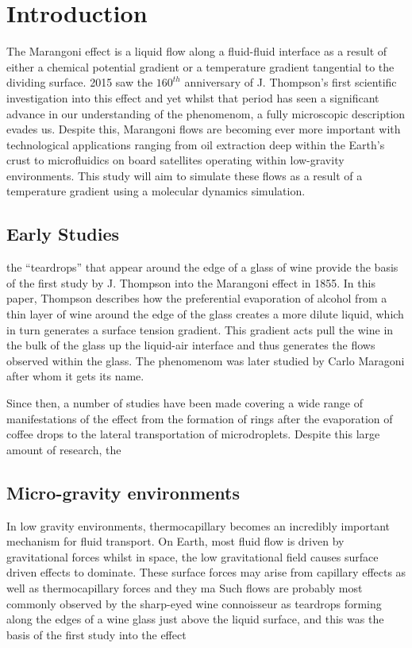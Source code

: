 \chapter{Introduction}

The Marangoni effect is a liquid flow along a fluid-fluid interface as a result of either a chemical potential gradient or a temperature gradient tangential to the dividing surface.
2015 saw the $160^{th}$ anniversary of J. Thompson's first scientific investigation into this effect and yet whilst that period has seen a significant advance in our understanding of the phenomenom, a fully microscopic description evades us.
Despite this, Marangoni flows are becoming ever more important with technological applications ranging from oil extraction deep within the Earth's crust to microfluidics on board satellites operating within low-gravity environments.
This study will aim to simulate these flows as a result of a temperature gradient using a molecular dynamics simulation.

\section{Early Studies} 
the ``teardrops'' that appear around the edge of a glass of wine provide the basis of the first study by J. Thompson into the Marangoni effect in 1855\cite{Thompson1855}.
In this paper, Thompson describes how the preferential evaporation of alcohol from a thin layer of wine around the edge of the glass creates a more dilute liquid, which in turn generates a surface tension gradient.
This gradient acts pull the wine in the bulk of the glass up the liquid-air interface and thus generates the flows observed within the glass.
The phenomenom was later studied by Carlo Maragoni after whom it gets its name.

Since then, a number of studies have been made covering a wide range of manifestations of the effect from the formation of rings after the evaporation of coffee drops to the lateral transportation of microdroplets.
Despite this large amount of research, the 

\section{Micro-gravity environments}
In low gravity environments, thermocapillary becomes an incredibly important mechanism for fluid transport.
On Earth, most fluid flow is driven by gravitational forces whilst in space, the low gravitational field causes surface driven effects to dominate.
These surface forces may arise from capillary effects as well as thermocapillary forces and they ma
Such flows are probably most commonly observed by the sharp-eyed wine connoisseur as teardrops forming along the edges of a wine glass just above the liquid surface, and this was the basis of the first study into the effect  

